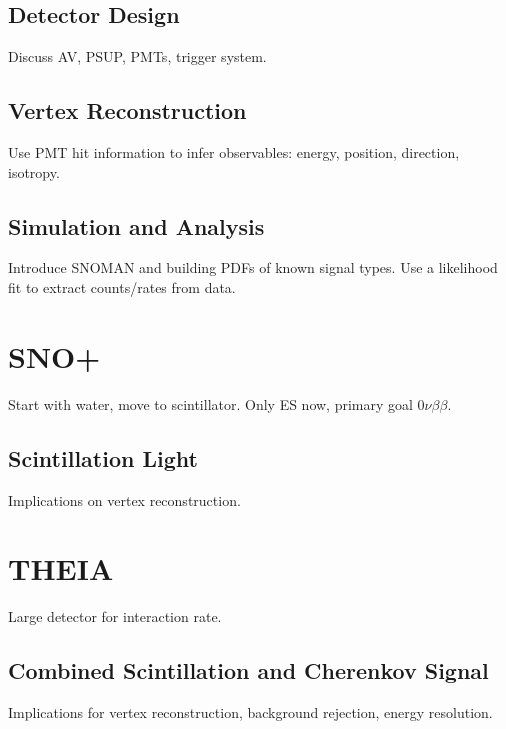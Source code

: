 \subsection{Detector Design}

Discuss AV, PSUP, PMTs, trigger system.

\subsection{Vertex Reconstruction}

Use PMT hit information to infer observables: energy, position, direction, isotropy.

\subsection{Simulation and Analysis}

Introduce SNOMAN and building PDFs of known signal types.
Use a likelihood fit to extract counts/rates from data.


\section{SNO+}

Start with water, move to scintillator. Only ES now, primary goal 0$\nu\beta\beta$.

\subsection{Scintillation Light}

Implications on vertex reconstruction.

\section{T\textsc{HEIA}}

Large detector for interaction rate. 

\subsection{Combined Scintillation and Cherenkov Signal}

Implications for vertex reconstruction, background rejection, energy resolution.
